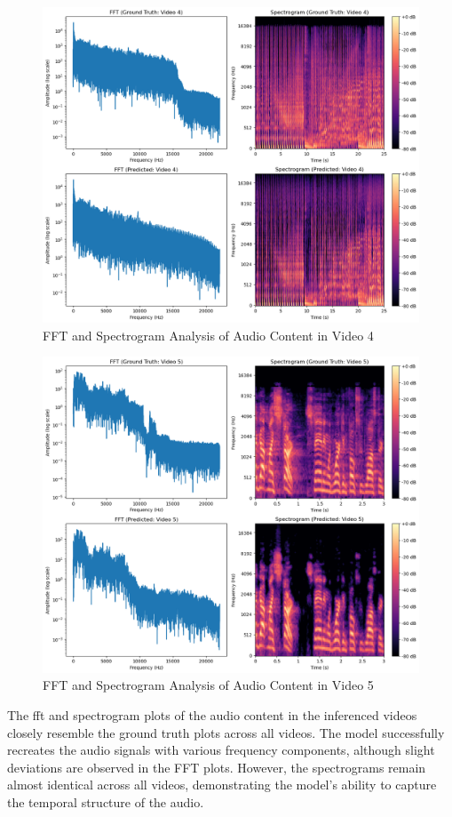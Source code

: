 \documentclass{ioereport}
\begin{document}
\begin{figure}[H]
    \centering
    \includegraphics[width=0.8\linewidth]{assets/audio_video_analysis/Video_4_analysis.png}
    \caption{FFT and Spectrogram Analysis of Audio Content in Video 4}
    \label{fig:fft-spec-v4}
\end{figure}

\begin{figure}[H]
    \centering
    \includegraphics[width=0.8\linewidth]{assets/audio_video_analysis/Video_5_analysis.png}
    \caption{FFT and Spectrogram Analysis of Audio Content in Video 5}
    \label{fig:fft-spec-v5}
\end{figure}

The \gls{fft} and spectrogram plots of the audio content in the inferenced videos closely resemble the ground truth plots across all videos. The model successfully recreates the audio signals with various frequency components, although slight deviations are observed in the FFT plots. However, the spectrograms remain almost identical across all videos, demonstrating the model's ability to capture the temporal structure of the audio. 
\end{document}
